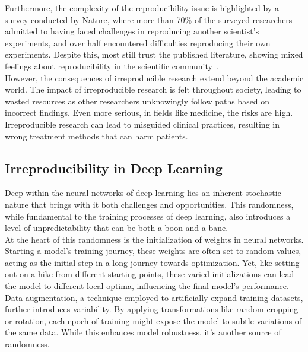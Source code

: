 Furthermore, the complexity of the reproducibility issue is highlighted by a survey conducted by Nature, where more than 70\% of the surveyed researchers admitted to having faced challenges in reproducing another scientist's experiments, and over half encountered difficulties reproducing their own experiments. Despite this, most still trust the published literature, showing mixed feelings about reproducibility in the scientific community~\cite{PMID:27225100}.\\

However, the consequences of irreproducible research extend beyond the academic world. The impact of irreproducible research is felt throughout society, leading to wasted resources as other researchers unknowingly follow paths based on incorrect findings. Even more serious, in fields like medicine, the risks are high. Irreproducible research can lead to misguided clinical practices, resulting in wrong treatment methods that can harm patients.\\

\subsection{Irreproducibility in Deep Learning}

Deep within the neural networks of deep learning lies an inherent stochastic nature that brings with it both challenges and opportunities. This randomness, while fundamental to the training processes of deep learning, also introduces a level of unpredictability that can be both a boon and a bane.\\

At the heart of this randomness is the initialization of weights in neural networks. Starting a model's training journey, these weights are often set to random values, acting as the initial step in a long journey towards optimization. Yet, like setting out on a hike from different starting points, these varied initializations can lead the model to different local optima, influencing the final model's performance.\\

Data augmentation, a technique employed to artificially expand training datasets, further introduces variability. By applying transformations like random cropping or rotation, each epoch of training might expose the model to subtle variations of the same data. While this enhances model robustness, it's another source of randomness.\\

